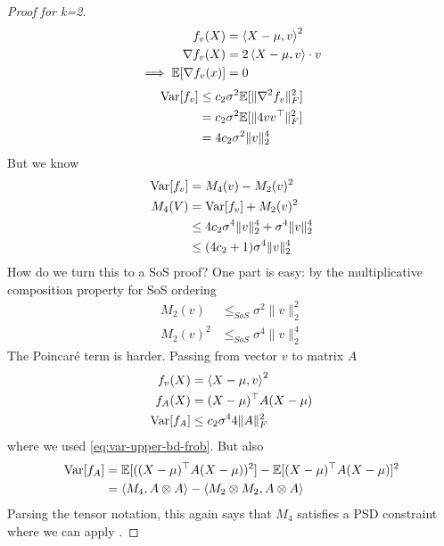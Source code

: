 \begin{proof}[Proof for k=2]
  \begin{align}
    f_v(X) &= \braket{X - \mu, v}^2 \\
    \nabla f_v(X) &= 2 \braket{X - \mu, v} \cdot v \\
    \implies \mathbb{E}[\nabla f_v(x)] &= 0
  \end{align}
  \begin{align}
    \operatorname{Var}[f_v]
    &\leq c_2 \sigma^2 \mathbb{E}[\|\nabla^2 f_v\|_F^2] \\
    &= c_2 \sigma^2 \mathbb{E}[\|4 v v^\top \|_F^2] \\
    &= 4 c_2 \sigma^2 \|v\|_2^4
  \end{align}
  But we know
  \begin{align}
    \operatorname{Var}[f_v]
    &= M_4(v) - M_2(v)^2 \\
    M_4(V) 
    &= \operatorname{Var}[f_v] + M_2(v)^2 \\
    &\leq 4 c_2 \sigma^4 \|v\|_2^4 + \sigma^4 \|v\|_2^4 \label{eq:var-upper-bd-frob}\\
    &\leq (4 c_2 + 1) \sigma^4 \|v\|_2^4 
  \end{align}
  How do we turn this to a SoS proof? One part is easy:
  by the multiplicative composition property for SoS ordering
  \begin{align}
    M_2(v) &\leq_{SoS} \sigma^2 \|v\|_2^2 \\
    M_2(v)^2 &\leq_{SoS} \sigma^4 \|v\|_2^4
  \end{align}
  The Poincar\'e term is harder. Passing from vector $v$ to matrix $A$
  \begin{align}
    f_v(X) &= \braket{X - \mu, v}^2 \\
    f_A(X) &= (X - \mu)^\top A (X - \mu) \\
    \operatorname{Var}[f_A] &\leq c_2 \sigma^4 4 \|A\|_F^2
  \end{align}
  where we used \cref{eq:var-upper-bd-frob}. But also
  \begin{align}
    \operatorname{Var}[f_A]
    &= \mathbb{E}[((X - \mu)^\top A (X - \mu))^2] - \mathbb{E}[(X - \mu)^\top A (X - \mu)]^2 \\
    &= \braket{M_4, A \otimes A} - \braket{M_2 \otimes M_2, A \otimes A}
  \end{align}
  Parsing the tensor notation, this again says that $M_4$ satisfies a PSD
  constraint where we can apply .
\end{proof}

